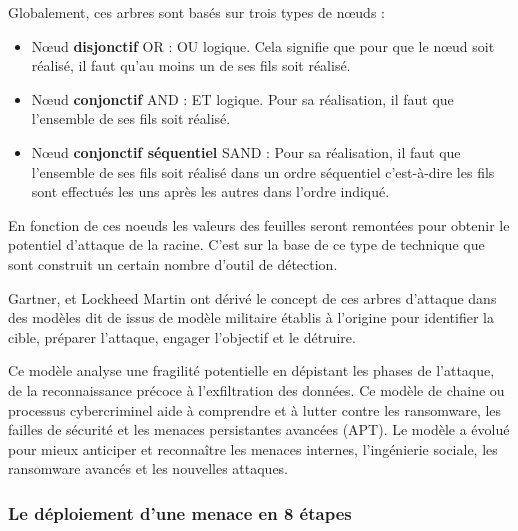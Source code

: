 Globalement, ces arbres sont basés sur trois types de nœuds :

\begin{itemize}
  \item Nœud \textbf{disjonctif} OR : OU logique. Cela signifie que pour que le nœud soit réalisé, il faut qu’au moins un de ses fils soit réalisé.
  \item Nœud \textbf{conjonctif} AND : ET logique. Pour sa réalisation, il faut que l’ensemble de ses fils soit réalisé.
  \item Nœud \textbf{conjonctif séquentiel }SAND : Pour sa réalisation, il faut que l'ensemble de ses fils soit réalisé dans un ordre séquentiel c'est-à-dire les fils sont effectués les uns après les autres dans l’ordre indiqué.
\end{itemize}

En fonction de ces noeuds les valeurs des feuilles seront remontées pour obtenir le potentiel d'attaque de la racine.
C'est sur la base de ce type de technique que sont construit un certain nombre d'outil de détection.
 

Gartner, et Lockheed Martin ont dérivé le concept de ces arbres d'attaque dans des modèles dit de  issus de modèle militaire établis à l’origine pour identifier la cible, préparer l’attaque, engager l’objectif et le détruire.

Ce modèle analyse une fragilité potentielle en dépistant les phases de l’attaque, de la reconnaissance précoce à l’exfiltration des données. Ce modèle de chaine ou processus cybercriminel aide à comprendre et à lutter contre les ransomware, les failles de sécurité et les menaces persistantes avancées (APT). Le modèle a évolué pour mieux anticiper et reconnaître les menaces internes, l’ingénierie sociale, les ransomware avancés et les nouvelles attaques.

\subsubsection{Le déploiement d'une menace en 8 étapes}


